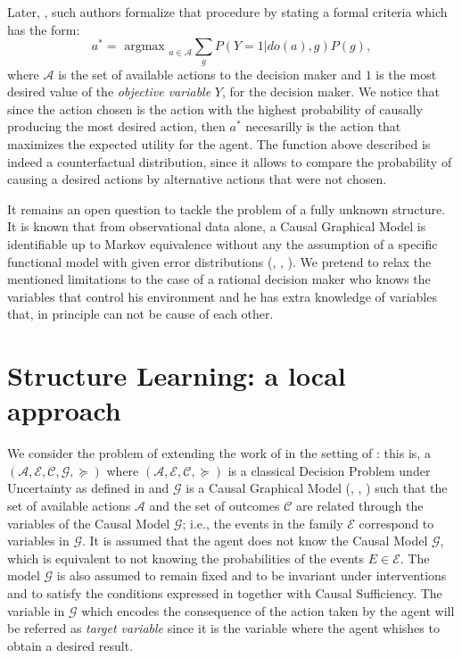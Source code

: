 \documentclass[letterpaper]{article}
\begin{document}
Later, \cite{2019arXiv190202279G}, such authors formalize that procedure by stating a formal criteria which has the form:
\[  a^\ast = \textrm{ argmax }_{a \in \mathcal{A}}\sum_g P(Y=1 | do(a), g)P(g), \]
where $\mathcal{A}$ is the set of available actions to the decision maker and $1$ is the most desired value of the \textit{objective variable} $Y$, for the decision maker. We notice that since the action chosen is the action with the highest probability of causally producing the most desired action, then $a^\ast$ necesarilly is the action that maximizes the expected utility for the agent. The function above described is indeed a counterfactual distribution, since it allows to compare the probability of causing a desired actions by alternative actions that were not chosen.

It remains an open question to tackle the problem of a fully unknown structure. It is known that from observational data alone, a Causal Graphical Model is identifiable up to Markov equivalence without any the assumption of a specific functional model with given error distributions (\cite{hauser2012characterization}, \cite{hauser2012two}, \cite{peters2011identifiability}). We pretend to relax the mentioned limitations to the case of a rational decision maker who knows the variables that control his environment and he has extra knowledge of variables that, in principle can not be cause of each other. 

\section{Structure Learning: a local approach}
We consider the problem of extending the work of \cite{gonzalez2018playing} in the setting of \cite{2019arXiv190202279G}: this is, a $(\mathcal{A}, \mathcal{E}, \mathcal{C}, \mathcal{G}, \succeq)$ where $(\mathcal{A}, \mathcal{E}, \mathcal{C}, \succeq)$ is a classical Decision Problem under Uncertainty as defined in \cite{bernardo2000bayesian} and $\mathcal{G}$ is a Causal Graphical Model (\cite{spirtes2000causation}, \cite{koller2009probabilistic}, \cite{sucar2015probabilistic}) such that the set of available actions $\mathcal{A}$ and the set of outcomes $\mathcal{C}$ are related through the variables of the Causal Model $\mathcal{G}$; i.e., the events in the family $\mathcal{E}$ correspond to variables in $\mathcal{G}$. It is assumed that the agent does not know the Causal Model $\mathcal{G}$, which is equivalent to not knowing the probabilities of the events $E \in \mathcal{E}$. The model $\mathcal{G}$ is also assumed to remain fixed and to be invariant under interventions \cite{woodward2005making} and to satisfy the conditions expressed in \cite{spirtes2000causation} together with Causal Sufficiency. The variable in $\mathcal{G}$ which encodes the consequence of the action taken by the agent will be referred as \textit{target variable} since it is the variable where the agent whishes to obtain a desired result. 
\end{document}
